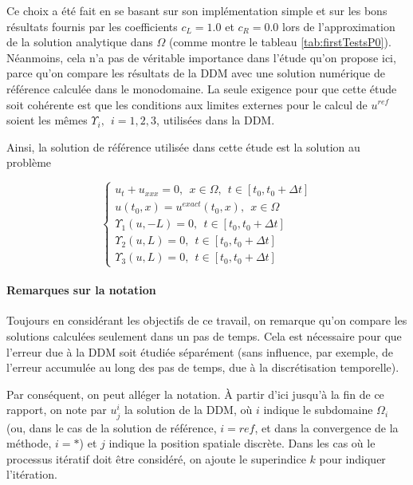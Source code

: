 \indent Ce choix a été fait en se basant sur son implémentation simple et sur les bons résultats fournis par les coefficients $c_L = 1.0$ et $c_R = 0.0$ lors de l'approximation de la solution analytique dans $\Omega$ (comme montre le tableau \ref{tab:firstTestsP0}). Néanmoins, cela n'a pas de véritable importance dans l'étude qu'on propose ici, parce qu'on compare les résultats de la DDM avec une solution numérique de référence calculée  dans le monodomaine. La seule exigence pour que cette étude soit cohérente est que les conditions aux limites externes pour le calcul de $u^{ref}$ soient les mêmes $\Upsilon_i, \ \ i=1,2,3$, utilisées dans la DDM.

\indent Ainsi, la solution de référence utilisée dans cette étude est la solution au problème

\begin{equation}
	\label{eq:problemMonodomain}
	\begin{cases}
	u_t + u_{xxx} = 0, \ \ x \in \Omega, \ \ t \in [t_0, t_0+\Delta t] \\
	u(t_0,x) = u^{exact}(t_0,x) , \ \ x \in \Omega \\ 
	\Upsilon_1(u,-L) = 0, \ \ t \in [t_0, t_0+\Delta t] \\
	\Upsilon_2(u,L) = 0, \ \ t \in [t_0, t_0+\Delta t] \\
	\Upsilon_3(u,L) = 0, \ \ t \in [t_0, t_0+\Delta t]
	\end{cases}
\end{equation}


\paragraph{Remarques sur la notation}

\indent Toujours en considérant les objectifs de ce travail, on remarque qu'on compare les solutions calculées seulement dans un pas de temps. Cela est nécessaire pour que l'erreur due à la DDM soit étudiée séparément (sans influence, par exemple, de l'erreur accumulée au long des pas de temps, due à la discrétisation temporelle).

\indent Par conséquent, on peut alléger la notation. À partir d'ici jusqu'à la fin de ce rapport, on note par $u_j^i$ la solution de la DDM, où $i$ indique le subdomaine $\Omega_i$ (ou, dans le cas de la solution de référence, $i=ref$, et dans la convergence de la méthode, $i=*$) et $j$ indique la position spatiale discrète. Dans les cas où le processus itératif doit être considéré, on ajoute le superindice $k$ pour indiquer l'itération.


